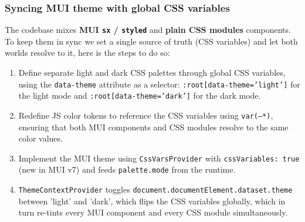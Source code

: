 \subsubsection{Syncing MUI theme with global CSS variables}

The codebase mixes \textbf{MUI \lstinline|sx| / \lstinline|styled|} and \textbf{plain CSS modules} components. To keep them in sync we set a single source of truth (CSS variables) and let both worlds resolve to it, here is the steps to do so:

\begin{enumerate}
    \item Define separate light and dark CSS palettes through global CSS variables, using the \texttt{data-theme} attribute as a selector: \texttt{:root[data-theme='light']} for the light mode and \texttt{:root[data-theme='dark']} for the dark mode.
    \item Redefine JS color tokens to reference the CSS variables using \texttt{var(--*)}, ensuring that both MUI components and CSS modules resolve to the same color values.
    \item Implement the MUI theme using \texttt{CssVarsProvider} with \texttt{cssVariables: true} (new in MUI v7) and feeds \texttt{palette.mode} from the runtime.
    \item \texttt{ThemeContextProvider} toggles \texttt{document.documentElement.dataset.theme} between 'light' and 'dark', which flips the CSS variables globally, which in turn re-tints every MUI component and every CSS module simultaneously.
\end{enumerate}

